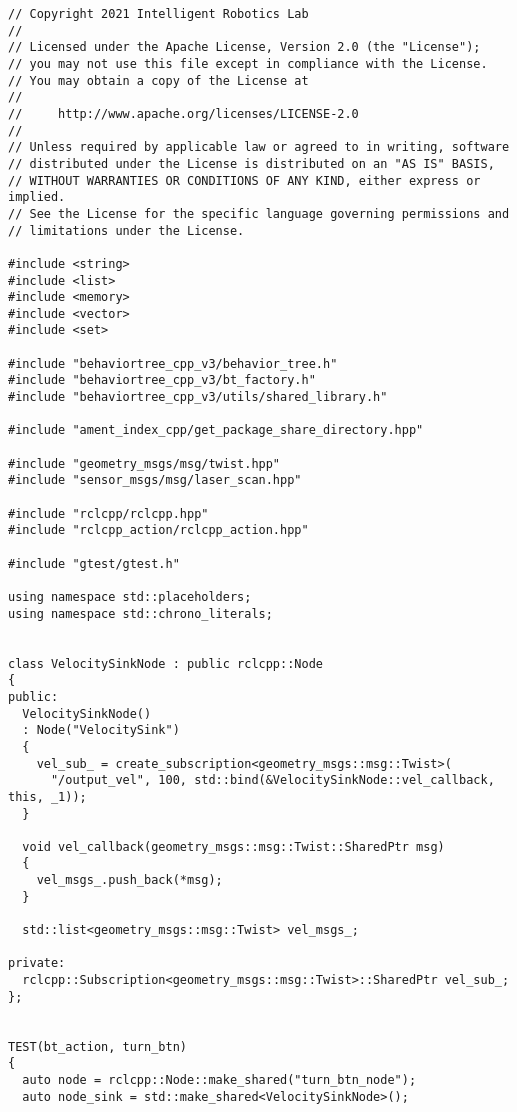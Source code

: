  \footnotesize
\begin{tcolorbox}[sharp corners, colframe=gray!80, colback=LightGray, left=0pt, top=0pt, bottom=0pt, title=\texttt{br2\_bt\_bumpgo/tests/bt\_action\_test.cpp}]
  \begin{verbatim}
// Copyright 2021 Intelligent Robotics Lab
//
// Licensed under the Apache License, Version 2.0 (the "License");
// you may not use this file except in compliance with the License.
// You may obtain a copy of the License at
//
//     http://www.apache.org/licenses/LICENSE-2.0
//
// Unless required by applicable law or agreed to in writing, software
// distributed under the License is distributed on an "AS IS" BASIS,
// WITHOUT WARRANTIES OR CONDITIONS OF ANY KIND, either express or implied.
// See the License for the specific language governing permissions and
// limitations under the License.

#include <string>
#include <list>
#include <memory>
#include <vector>
#include <set>

#include "behaviortree_cpp_v3/behavior_tree.h"
#include "behaviortree_cpp_v3/bt_factory.h"
#include "behaviortree_cpp_v3/utils/shared_library.h"

#include "ament_index_cpp/get_package_share_directory.hpp"

#include "geometry_msgs/msg/twist.hpp"
#include "sensor_msgs/msg/laser_scan.hpp"

#include "rclcpp/rclcpp.hpp"
#include "rclcpp_action/rclcpp_action.hpp"

#include "gtest/gtest.h"

using namespace std::placeholders;
using namespace std::chrono_literals;


class VelocitySinkNode : public rclcpp::Node
{
public:
  VelocitySinkNode()
  : Node("VelocitySink")
  {
    vel_sub_ = create_subscription<geometry_msgs::msg::Twist>(
      "/output_vel", 100, std::bind(&VelocitySinkNode::vel_callback, this, _1));
  }

  void vel_callback(geometry_msgs::msg::Twist::SharedPtr msg)
  {
    vel_msgs_.push_back(*msg);
  }

  std::list<geometry_msgs::msg::Twist> vel_msgs_;

private:
  rclcpp::Subscription<geometry_msgs::msg::Twist>::SharedPtr vel_sub_;
};


TEST(bt_action, turn_btn)
{
  auto node = rclcpp::Node::make_shared("turn_btn_node");
  auto node_sink = std::make_shared<VelocitySinkNode>();


\end{verbatim}
\end{tcolorbox}
